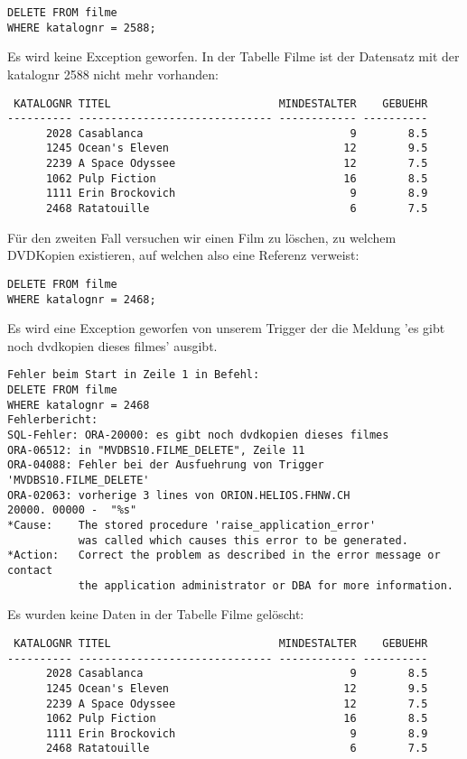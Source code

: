 \documentclass[11pt,a4paper,parskip=half]{scrartcl}
\begin{document}
\begin{lstlisting}
DELETE FROM filme
WHERE katalognr = 2588;
\end{lstlisting}

Es wird keine Exception geworfen. In der Tabelle Filme ist der Datensatz mit der katalognr 2588 nicht mehr vorhanden:

\begin{lstlisting}
 KATALOGNR TITEL                          MINDESTALTER    GEBUEHR
---------- ------------------------------ ------------ ----------
      2028 Casablanca                                9        8.5 
      1245 Ocean's Eleven                           12        9.5 
      2239 A Space Odyssee                          12        7.5 
      1062 Pulp Fiction                             16        8.5 
      1111 Erin Brockovich                           9        8.9 
      2468 Ratatouille                               6        7.5 
\end{lstlisting}

Für den zweiten Fall versuchen wir einen Film zu löschen, zu welchem DVDKopien existieren, auf welchen also eine Referenz verweist:

\begin{lstlisting}
DELETE FROM filme
WHERE katalognr = 2468;
\end{lstlisting}

Es wird eine Exception geworfen von unserem Trigger der die Meldung 'es gibt noch dvdkopien dieses filmes' ausgibt.

\begin{lstlisting}
Fehler beim Start in Zeile 1 in Befehl:
DELETE FROM filme
WHERE katalognr = 2468
Fehlerbericht:
SQL-Fehler: ORA-20000: es gibt noch dvdkopien dieses filmes
ORA-06512: in "MVDBS10.FILME_DELETE", Zeile 11
ORA-04088: Fehler bei der Ausfuehrung von Trigger 'MVDBS10.FILME_DELETE'
ORA-02063: vorherige 3 lines von ORION.HELIOS.FHNW.CH
20000. 00000 -  "%s"
*Cause:    The stored procedure 'raise_application_error'
           was called which causes this error to be generated.
*Action:   Correct the problem as described in the error message or contact
           the application administrator or DBA for more information.
\end{lstlisting}

Es wurden keine Daten in der Tabelle Filme gelöscht:

\begin{lstlisting}
 KATALOGNR TITEL                          MINDESTALTER    GEBUEHR
---------- ------------------------------ ------------ ----------
      2028 Casablanca                                9        8.5 
      1245 Ocean's Eleven                           12        9.5 
      2239 A Space Odyssee                          12        7.5 
      1062 Pulp Fiction                             16        8.5 
      1111 Erin Brockovich                           9        8.9 
      2468 Ratatouille                               6        7.5 
\end{lstlisting}
\end{document}
